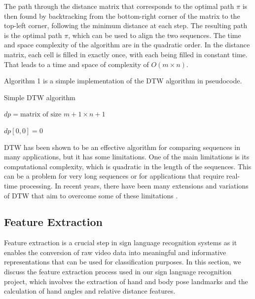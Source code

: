 \documentclass[final,rdr32.tex]{subfiles}
\begin{document}
The path through the distance matrix that corresponds to the optimal path $\pi$ is then found by backtracking from the bottom-right corner of the matrix to the top-left corner, following the minimum distance at each step. The resulting path is the optimal path $\pi$, which can be used to align the two sequences. The time and space complexity of the algorithm are in the quadratic order. In the distance matrix, each cell is filled in exactly once, with each being filled in constant time. That leads to a time and space of complexity of $O(m \times n)$.

Algorithm 1 is a simple implementation of the DTW algorithm in pseudocode.
\begin{algorithm}
    \caption{Simple DTW algorithm}


    $dp = \text{matrix of size } m+1 \times n+1$

    $dp[0,0] = 0$


\end{algorithm}

DTW has been shown to be an effective algorithm for comparing sequences in many applications, but it has some limitations. One of the main limitations is its computational complexity, which is quadratic in the length of the sequences. This can be a problem for very long sequences or for applications that require real-time processing. In recent years, there have been many extensions and variations of DTW that aim to overcome some of these limitations \cite{ratanamahatana2004everything}.

\subsection{Feature Extraction}

Feature extraction is a crucial step in sign language recognition systems as it enables the conversion of raw video data into meaningful and informative representations that can be used for classification purposes. In this section, we discuss the feature extraction process used in our sign language recognition project, which involves the extraction of hand and body pose landmarks and the calculation of hand angles and relative distance features.
\end{document}
